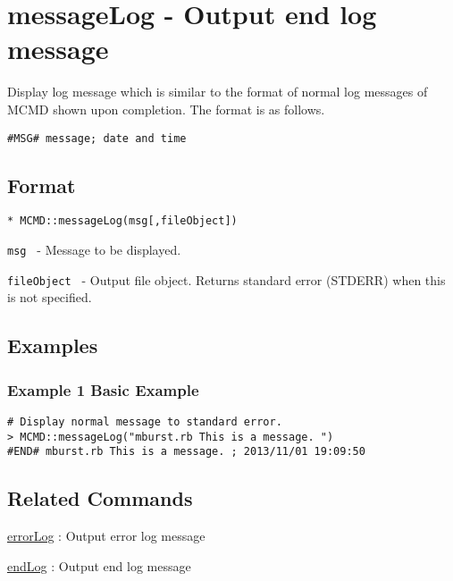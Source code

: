
%

\section{messageLog - Output end log message \label{sect:messageLog}}
Display log message which is similar to the format of normal log messages of MCMD shown upon completion. The format is as follows.

\begin{Verbatim}[baselinestretch=0.7,frame=single]
#MSG# message; date and time
\end{Verbatim}
 
\subsection{Format}

{\Large
\begin{verbatim}
* MCMD::messageLog(msg[,fileObject])
\end{verbatim}
} 

\begin{description}
	\setlength{\itemindent}{-5mm}
	\item {\large \verb/msg /} - Message to be displayed.
	\item {\large \verb/fileObject /} - Output file object. Returns standard error (STDERR) when this is not specified.

\end{description}

\subsection{Examples}
\subsubsection*{Example 1 Basic Example}

\begin{Verbatim}[baselinestretch=0.7,frame=single]
# Display normal message to standard error. 
> MCMD::messageLog("mburst.rb This is a message. ")
#END# mburst.rb This is a message. ; 2013/11/01 19:09:50
\end{Verbatim}

\subsection{Related Commands}
\hyperref[sect:errorLogRB]{errorLog} : Output error log message

\hyperref[sect:endRB]{endLog} : Output end log message

%

